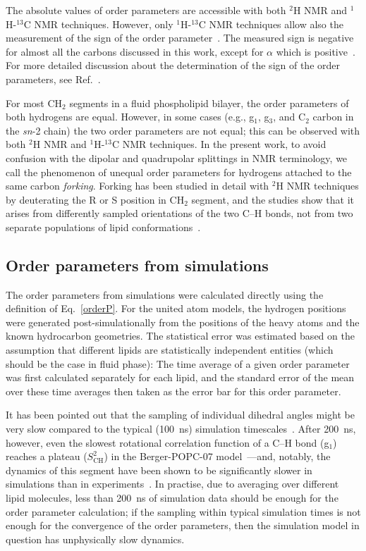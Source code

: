 \documentclass[journal=jpcbfk,manuscript=article]{achemso}
\begin{document}
The absolute values of order parameters are accessible with both $^2$H NMR and $^1$H-$^{13}$C NMR techniques. 
However, only $^1$H-$^{13}$C NMR techniques allow also the measurement of the sign of the order parameter~\cite{hong95a,hong95b,gross97}. 
The measured sign is negative for almost all the carbons discussed in this work, except for $\alpha$ which is positive~\cite{hong95a,hong95b,gross97}. 
For more detailed discussion about the determination of the sign of the order parameters, see Ref.~. 

For most CH$_2$ segments in a fluid phospholipid bilayer, the order parameters of both hydrogens are equal.
However, in some cases (e.g., g$_1$, g$_3$, and  C$_2$ carbon in the \textit{sn}-2 chain) the two order parameters are not equal;
this  can be observed with both $^2$H NMR and $^1$H-$^{13}$C NMR techniques. In the present work,
to avoid confusion with the dipolar and quadrupolar splittings in NMR terminology,
we call the phenomenon of unequal order parameters for hydrogens attached to the same carbon {\it forking}. 
Forking has been studied in detail with $^2$H NMR techniques by deuterating the R or S position in CH$_2$ segment, and
the studies show that it arises from differently sampled orientations of the two C--H bonds, not from two 
separate populations of lipid conformations~\cite{engel81,gally81}.


\subsection{Order parameters from simulations}
The order parameters from simulations were calculated directly using the definition of Eq.~\ref{orderP}.
For the united atom models, the hydrogen positions were generated 
post-simulationally from the positions of the heavy atoms and the known hydrocarbon geometries.
The statistical error was estimated based on the assumption that different lipids are statistically independent 
entities (which should be the case in fluid phase):
The time average of a given order parameter was first calculated separately for each lipid,
and the standard error of the mean over these time averages then taken as the error bar for this order parameter.

It has been pointed out that the sampling of individual dihedral angles might be very
slow compared to the typical (100~ns) simulation timescales~\cite{vogel12}.
After 200~ns, however, even the slowest rotational correlation function of a C--H bond  (g$_1$) reaches
a plateau ($S_\mathrm{CH}^2$) in the Berger-POPC-07 model~\cite{ollila07a}---and, notably,
the dynamics of this segment have been shown to be significantly slower in simulations
than in experiments~\cite{ferreira15}.
In practise,
due to averaging over different lipid molecules,
less than 200~ns of simulation data should be enough for the order parameter calculation;
if the sampling within typical simulation times
is not enough for the convergence of the order parameters,
then the simulation model in question has unphysically slow dynamics.
\end{document}
